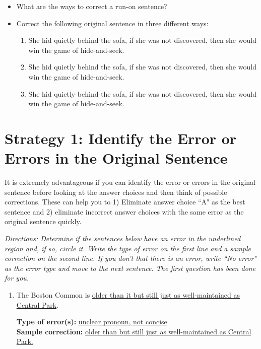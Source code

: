 \documentclass[12pt]{book}
\begin{document}
\begin{enumerate}
\begin{itemize}
\bigskip
\item What are the ways to correct a run-on sentence? \hrulefill

\bigskip
\item Correct the following original sentence in three different ways:
\begin{enumerate}
\item She hid quietly behind the sofa, if she was not discovered, then she would win the game of hide-and-seek. 

\bigskip
\item She hid quietly behind the sofa, if she was not discovered, then she would win the game of hide-and-seek. 

\bigskip
\item She hid quietly behind the sofa, if she was not discovered, then she would win the game of hide-and-seek. 
\end{enumerate}
\end{itemize}

\newpage



\section[Sentence Improvement]{Strategy 1: Identify the Error or Errors in the Original Sentence}
It is extremely advantageous if you can identify the error or errors in the original sentence before looking at the answer choices and then think of possible corrections. These can help you to 1) Eliminate answer choice ``A" as the best sentence and 2) eliminate incorrect answer choices with the same error as the original sentence quickly. 

\bigskip
\textit{Directions: Determine if the sentences below have an error in the underlined region and, if so, circle it. Write the type of error on the first line and a sample correction on the second line. If you don't that there is an error, write ``No error" as the error type and move to the next sentence. The first question has been done for you.}

\begin{enumerate}
\item The Boston Common is \ul{ older than it but still just as well-maintained as Central Park}.

\bigskip
\textbf{Type of error(s):} \ul{unclear pronoun, not concise} \\
\textbf{Sample correction:} \ul{older than but still just as well-maintained as Central Park.}


\end{enumerate}
\end{enumerate}
\end{document}

